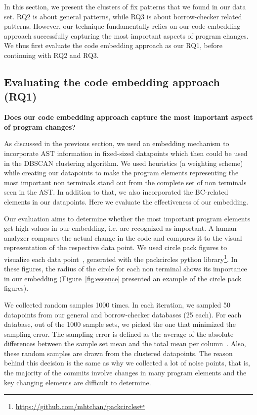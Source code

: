 In this section, we present the clusters of fix patterns that we found in our data set. RQ2 is about general patterns, while RQ3 is about borrow-checker related patterns. However, our technique fundamentally relies on our code embedding approach successfully capturing the most important aspects of program changes. We thus first evaluate the code embedding approach as our RQ1, before continuing with RQ2 and RQ3.

\subsection{Evaluating the code embedding approach (RQ1)}

\textbf{Does our code embedding approach capture the most important aspect of program changes?} 


As discussed in the previous section, we used an embedding mechanism to incorporate AST information in fixed-sized datapoints which then could be used in the DBSCAN clustering algorithm. We used heuristics (a weighting scheme) while creating our datapoints to make the program elements representing the most important non terminals stand out from the complete set of non terminals seen in the AST. In addition to that, we also incorporated the BC-related elements in our datapoints. Here we evaluate the effectiveness of our embedding.

Our evaluation aims to determine whether the most important program elements get high values in our embedding, i.e. are recognized as important. A human analyzer compares the actual change in the code and compares it to the visual representation of the respective data point. We used circle pack figures to visualize each data point~\citep{collins2003circle}, generated with the packcircles python library\footnote{\url{https://github.com/mhtchan/packcircles}}. In these figures, the radius of the circle for each non terminal shows its importance in our embedding (Figure~\ref{fig:essence} presented an example of the circle pack figures).

We collected random samples 1000 times. In each iteration, we sampled 50 datapoints from our general and borrow-checker databases (25 each). For each database, out of the 1000 sample sets, we picked the one that minimized the sampling error. The sampling error is defined as the average of the absolute differences between the sample set mean and the total mean per column~\citep{degroot2012probability}. Also, these random samples are drawn from the clustered datapoints. The reason behind this decision is the same as why we collected a lot of noise points, that is, the majority of the commits involve changes in many program elements and the key changing elements are difficult to determine.

